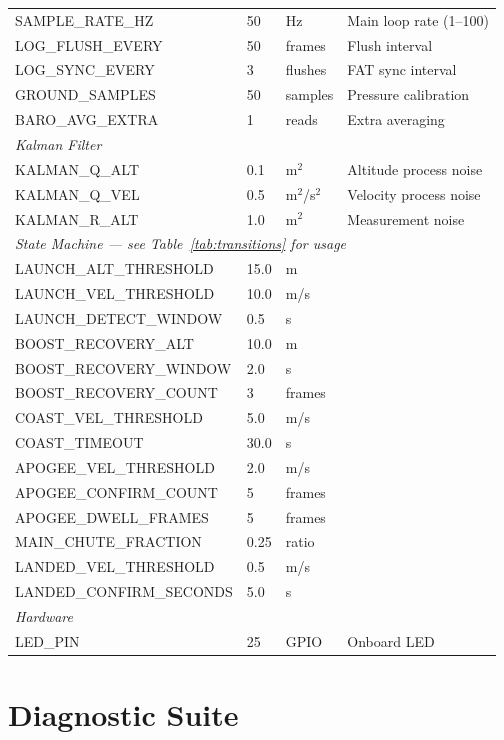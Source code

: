 \documentclass[11pt, a4paper, twoside]{article}
\begin{document}
\begin{longtable}{l l l p{5.5cm}}
SAMPLE\_RATE\_HZ & 50 & Hz & Main loop rate (1--100) \\
LOG\_FLUSH\_EVERY & 50 & frames & Flush interval \\
LOG\_SYNC\_EVERY & 3 & flushes & FAT sync interval \\
GROUND\_SAMPLES & 50 & samples & Pressure calibration \\
BARO\_AVG\_EXTRA & 1 & reads & Extra averaging \\
\midrule
\multicolumn{4}{l}{\textit{Kalman Filter}} \\
KALMAN\_Q\_ALT & 0.1 & m$^2$ & Altitude process noise \\
KALMAN\_Q\_VEL & 0.5 & m$^2$/s$^2$ & Velocity process noise \\
KALMAN\_R\_ALT & 1.0 & m$^2$ & Measurement noise \\
\midrule
\multicolumn{4}{l}{\textit{State Machine --- see Table~\ref{tab:transitions} for usage}} \\
LAUNCH\_ALT\_THRESHOLD & 15.0 & m & \\
LAUNCH\_VEL\_THRESHOLD & 10.0 & m/s & \\
LAUNCH\_DETECT\_WINDOW & 0.5 & s & \\
BOOST\_RECOVERY\_ALT & 10.0 & m & \\
BOOST\_RECOVERY\_WINDOW & 2.0 & s & \\
BOOST\_RECOVERY\_COUNT & 3 & frames & \\
COAST\_VEL\_THRESHOLD & 5.0 & m/s & \\
COAST\_TIMEOUT & 30.0 & s & \\
APOGEE\_VEL\_THRESHOLD & 2.0 & m/s & \\
APOGEE\_CONFIRM\_COUNT & 5 & frames & \\
APOGEE\_DWELL\_FRAMES & 5 & frames & \\
MAIN\_CHUTE\_FRACTION & 0.25 & ratio & \\
LANDED\_VEL\_THRESHOLD & 0.5 & m/s & \\
LANDED\_CONFIRM\_SECONDS & 5.0 & s & \\
\midrule
\multicolumn{4}{l}{\textit{Hardware}} \\
LED\_PIN & 25 & GPIO & Onboard LED \\
\bottomrule
\end{longtable}

\section{Diagnostic Suite}
\label{sec:diagnostics}
\end{document}
